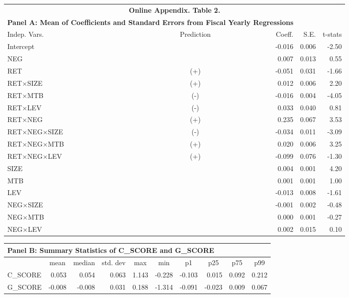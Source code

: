 \begin{table}[htbp] \label{oat2}
  \centering
    \begin{tabular}{lcrrr}
    \multicolumn{5}{c}{\textbf{Online Appendix. Table 2.}} \\
    \multicolumn{3}{c}{\textbf{Panel A: Mean of Coefficients and Standard Errors from Fiscal Yearly Regressions}} &&\\
    \midrule
    \midrule
    Indep. Vars. & Prediction & Coeff. & S.E. & t-stats \\
    \midrule
    Intercept &   & -0.016 & 0.006 & -2.50 \\
    NEG &   & 0.007 & 0.013 & 0.55 \\
    RET & (+) & -0.051 & 0.031 & -1.66 \\
    RET$\times$SIZE & (+) & 0.012 & 0.006 & 2.20 \\
    RET$\times$MTB & (-) & -0.016 & 0.004 & -4.05 \\
    RET$\times$LEV & (-) & 0.033 & 0.040 & 0.81 \\
    RET$\times$NEG & (+) & 0.235 & 0.067 & 3.53 \\
    RET$\times$NEG$\times$SIZE & (-) & -0.034 & 0.011 & -3.09 \\
    RET$\times$NEG$\times$MTB & (+) & 0.020 & 0.006 & 3.25 \\
    RET$\times$NEG$\times$LEV & (+) & -0.099 & 0.076 & -1.30 \\
    SIZE &   & 0.004 & 0.001 & 4.20 \\
    MTB &   & 0.001 & 0.001 & 1.00 \\
    LEV &   & -0.013 & 0.008 & -1.61 \\
    NEG$\times$SIZE &   & -0.001 & 0.002 & -0.48 \\
    NEG$\times$MTB &   & 0.000 & 0.001 & -0.27 \\
    NEG$\times$LEV &   & 0.002 & 0.015 & 0.10 \\
    \bottomrule
    \bottomrule
    \end{tabular}%
\end{table}%

\begin{table}[htbp]
	\centering
	\begin{tabular}{lrrrrrrrrr}
		\multicolumn{10}{l}{\textbf{Panel B: Summary Statistics of C\_SCORE and G\_SCORE}}  \\
		\midrule
		\midrule
		& \multicolumn{1}{c}{mean} & \multicolumn{1}{c}{median} & \multicolumn{1}{c}{std. dev} & \multicolumn{1}{c}{max} & \multicolumn{1}{c}{min} & \multicolumn{1}{c}{p1} & \multicolumn{1}{c}{p25} & \multicolumn{1}{c}{p75} & \multicolumn{1}{c}{p99} \\
		\midrule
		C\_SCORE & 0.053 & 0.054 & 0.063 & 1.143 & -0.228 & -0.103 & 0.015 & 0.092 & 0.212 \\
		G\_SCORE & -0.008 & -0.008 & 0.031 & 0.188 & -1.314 & -0.091 & -0.023 & 0.009 & 0.067 \\
		\bottomrule
		\bottomrule
	\end{tabular}%
\end{table}%
